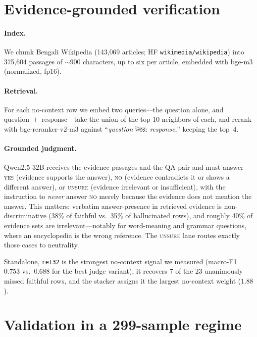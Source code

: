 \documentclass[11pt]{article}
\newcommand{\bn}[1]{{\bengalifont #1}}
\begin{document}
\section{Evidence-grounded verification}
\label{sec:retrieval}

\paragraph{Index.} We chunk Bengali Wikipedia (143{,}069 articles; HF
\texttt{wikimedia/wikipedia}) into 375{,}604 passages of ${\sim}900$
characters, up to six per article, embedded with bge-m3 \cite{bgem3}
(normalized, fp16).

\paragraph{Retrieval.} For each no-context row we embed two queries---the
question alone, and question~$+$~response---take the union of the top-10
neighbors of each, and rerank with bge-reranker-v2-m3 against
``\emph{question} \bn{উত্তর:} \emph{response},'' keeping the top~4.

\paragraph{Grounded judgment.} Qwen2.5-32B receives the evidence passages and
the QA pair and must answer \textsc{yes} (evidence supports the answer),
\textsc{no} (evidence contradicts it or shows a different answer), or
\textsc{unsure} (evidence irrelevant or insufficient), with the instruction to
\emph{never} answer \textsc{no} merely because the evidence does not mention
the answer. This matters: verbatim answer-presence in retrieved evidence is
non-discriminative (38\% of faithful vs.\ 35\% of hallucinated rows), and
roughly 40\% of evidence sets are irrelevant---notably for word-meaning and
grammar questions, where an encyclopedia is the wrong reference. The
\textsc{unsure} lane routes exactly those cases to neutrality.

Standalone, \texttt{ret32} is the strongest no-context signal we measured
(macro-F1 $0.753$ vs.\ $0.688$ for the best judge variant), it recovers 7 of
the 23 unanimously missed faithful rows, and the stacker assigns it the
largest no-context weight ($1.88$).

\section{Validation in a 299-sample regime}
\label{sec:validation}
\end{document}
